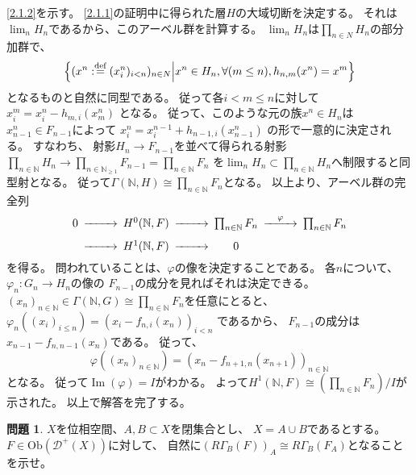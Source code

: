 \documentclass[uplatex,dvipdfmx]{jsarticle}
\makeatletter
\theoremstyle{definition}
\newtheorem{prob}[prob]{問題}
\renewenvironment{proof}[1][\proofname]{
  \pushQED{\qed}%
  \normalfont \topsep6\p@\@plus6\p@\relax
  \trivlist
  \item[\hskip\labelsep
    #1\@addpunct{\textbf{.}}]\ignorespaces
}{%
  \popQED\endtrivlist\@endpefalse
}
\providecommand{\proofname}{証明}
\DeclareMathOperator{\im}{\mathrm{Im}}
\newcommand{\Ob}{\mathrm{Ob}}
\newcommand\N{\mathbb{N}}
\newcommand\mcD{\mathcal{D}}
\def\dfn{:\overset{\mbox{{\scriptsize def}}}{=}}
\makeatother
\begin{document}
\begin{proof}
  \ref{2.1.2}を示す。
  \ref{2.1.1}の証明中に得られた層\(H\)の大域切断を決定する。
  それは\(\lim_n H_n\)であるから、このアーベル群を計算する。
  \(\lim_nH_n\)は\(\prod_{n\in N}H_n\)の部分加群で、
  \[
  \left\{ (x^n \dfn (x_i^n)_{i<n})_{n\in N} \middle| x^n \in H_n,
  \forall (m \leq n), h_{n,m}(x^n) = x^m \right\}
  \]
  となるものと自然に同型である。
  従って各\(i < m\leq n\)に対して
  \(x^m_i = x^n_i - h_{m,i}(x^n_m)\)
  となる。
  従って、このような元の族\(x^n\in H_n\)は\(x^n_{n-1}\in F_{n-1}\)によって
  \(x^n_i = x^{n-1}_i + h_{n-1,i}(x^n_{n-1})\)
  の形で一意的に決定される。
  すなわち、
  射影\(H_n\to F_{n-1}\)を並べて得られる射影
  \(\prod_{n\in \N}H_n\to \prod_{n\in \N_{\geq 1}}F_{n-1} =
  \prod_{n\in \N}F_n\)
  を\(\lim_n H_n \subset \prod_{n\in \N}H_n\)へ制限すると同型射となる。
  従って\(\Gamma(\N,H) \cong \prod_{n\in \N}F_n\)となる。
  以上より、アーベル群の完全列
  \[
  \begin{CD}
    0 @>>> H^0(\N,F) @>>> \prod_{n\in \N} F_n @> \varphi >> \prod_{n\in \N} F_n \\
    @>>> H^1(\N,F) @>>> 0 @.
  \end{CD}
  \]
  を得る。
  問われていることは、\(\varphi\)の像を決定することである。
  各\(n\)について、\(\varphi_n:G_n\to H_n\)の像の
  \(F_{n-1}\)の成分を見ればそれは決定できる。
  \((x_n)_{n\in \N}\in \Gamma(\N,G) \cong \prod_{n\in \N}F_n\)を任意にとると、
  \(\varphi_n((x_i)_{i\leq n}) = (x_i-f_{n,i}(x_n))_{i<n}\)
  であるから、
  \(F_{n-1}\)の成分は\(x_{n-1}-f_{n,n-1}(x_n)\)である。
  従って、
  \[
  \varphi((x_n)_{n\in \N}) = (x_n - f_{n+1,n}(x_{n+1}))_{n\in \N}
  \]
  となる。
  従って\(\im(\varphi) = I\)がわかる。
  よって\(H^1(\N,F) \cong (\prod_{n\in \N}F_n)/I\)が示された。
  以上で解答を完了する。
\end{proof}












\begin{prob}\label{2.2}
  \(X\)を位相空間、\(A,B\subset X\)を閉集合とし、
  \(X=A\cup B\)であるとする。
  \(F\in \Ob(\mcD^+(X))\)に対して、
  自然に\((R\Gamma_B(F))_A \cong R\Gamma_B(F_A)\)となることを示せ。
\end{prob}
\end{document}
